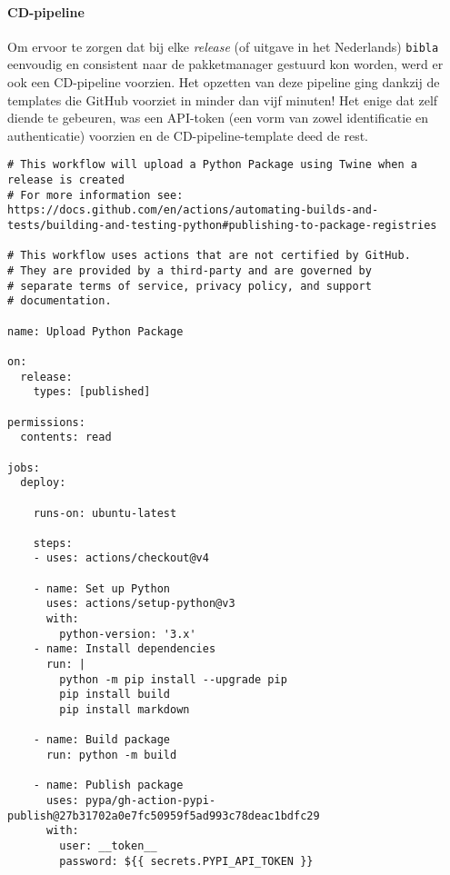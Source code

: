 \paragraph{CD-pipeline}
Om ervoor te zorgen dat bij elke \emph{release} (of uitgave in het Nederlands) \texttt{bibla} eenvoudig en consistent naar de pakketmanager gestuurd kon worden, werd er ook een CD-pipeline voorzien. Het opzetten van deze pipeline ging dankzij de templates die GitHub voorziet in minder dan vijf minuten! Het enige dat zelf diende te gebeuren, was een API-token (een vorm van zowel identificatie en authenticatie) voorzien en de CD-pipeline-template deed de rest.

\begin{verbatim}
# This workflow will upload a Python Package using Twine when a release is created
# For more information see: https://docs.github.com/en/actions/automating-builds-and-tests/building-and-testing-python#publishing-to-package-registries

# This workflow uses actions that are not certified by GitHub.
# They are provided by a third-party and are governed by
# separate terms of service, privacy policy, and support
# documentation.

name: Upload Python Package

on:
  release:
    types: [published]

permissions:
  contents: read

jobs:
  deploy:

    runs-on: ubuntu-latest

    steps:
    - uses: actions/checkout@v4

    - name: Set up Python
      uses: actions/setup-python@v3
      with:
        python-version: '3.x'
    - name: Install dependencies
      run: |
        python -m pip install --upgrade pip
        pip install build
        pip install markdown

    - name: Build package
      run: python -m build

    - name: Publish package
      uses: pypa/gh-action-pypi-publish@27b31702a0e7fc50959f5ad993c78deac1bdfc29
      with:
        user: __token__
        password: ${{ secrets.PYPI_API_TOKEN }}

\end{verbatim}
